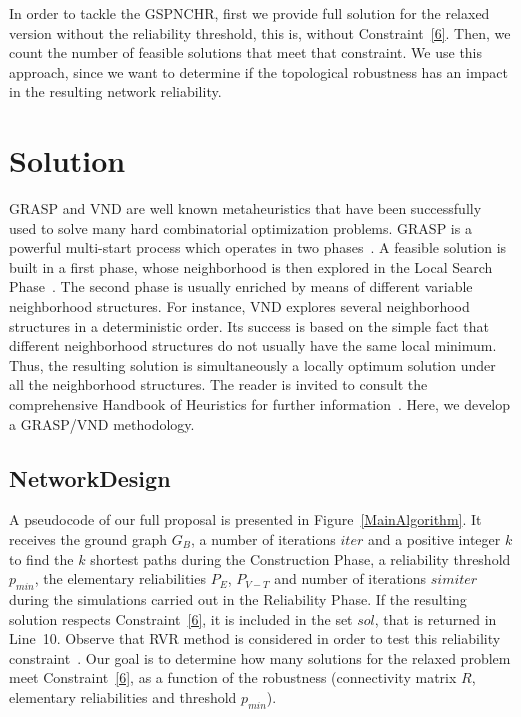 \documentclass{llncs}
\begin{document}
In order to tackle the GSPNCHR, first we provide full solution for the relaxed version without the reliability threshold, 
this is, without Constraint~\ref{6}. Then, we count the number of feasible solutions that meet that constraint. We use this approach, since we want to determine if the topological robustness has an impact in the resulting network reliability. 


\section{Solution}\label{solution}
GRASP and VND are well known metaheuristics that have been successfully used to solve many hard combinatorial optimization problems. GRASP is a powerful multi-start process which operates in two phases~\cite{51}. A feasible solution is built 
in a first phase, whose neighborhood is then explored in the Local Search Phase~\cite{51}. The second phase is usually enriched by means of different variable neighborhood structures. For instance, VND explores several neighborhood structures in a deterministic order. Its success is based on the simple fact that different neighborhood structures do not usually have the same local minimum. Thus,  the resulting solution is simultaneously a locally optimum solution under all the neighborhood structures. The reader is invited to consult the comprehensive Handbook of Heuristics for further information~\cite{50}. Here, we develop a GRASP/VND methodology.

\subsection{NetworkDesign}
A pseudocode of our full proposal is presented in Figure~\ref{MainAlgorithm}. 
It receives the ground graph $G_B$, a number of iterations $iter$ and a positive integer 
$k$ to find the $k$ shortest paths during the Construction Phase, a reliability threshold $p_{min}$, 
the elementary reliabilities $P_E$, $P_{V-T}$ and number of iterations $simiter$ during the simulations carried out in the Reliability Phase. If the resulting solution respects Constraint~\ref{6}, it is included 
in the set $sol$, that is returned in Line~10. Observe that RVR method is considered in order to test this reliability constraint~\cite{85}. Our goal is to determine how many solutions for the relaxed problem 
meet Constraint~\ref{6}, as a function of the robustness (connectivity matrix $R$, elementary reliabilities and threshold 
$p_{min}$). 
\end{document}
